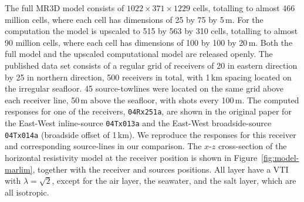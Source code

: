 \documentclass[
    paper,
  ]{geophysics}
\begin{document}
The full MR3D model consists of $1022 \times 371 \times 1229$ cells, totalling to almost 466 million cells, where each cell has dimensions of 25 by 75 by 5\,m. For the computation the model is upscaled to 515 by 563 by 310 cells, totalling to almost 90 million cells, where each cell has dimensions of 100 by 100 by 20\,m. Both the full model and the upscaled computational model are released openly. The published data set consists of a regular grid of receivers of 20 in eastern direction by 25 in northern direction, 500 receivers in total, with 1\,km spacing located on the irregular seafloor. 45 source-towlines were located on the same grid above each receiver line, 50\,m above the seafloor, with shots every 100\,m. The computed responses for one of the receivers, \texttt{04Rx251a}, are shown in the original paper for the East-West inline-source \texttt{04Tx013a} and the East-West broadside-source \texttt{04Tx014a} (broadside offset of 1\,km). We reproduce the responses for this receiver and corresponding source-lines in our comparison. The $x$-$z$ cross-section of the horizontal resistivity model at the receiver position is shown in Figure~\ref{fig:model-marlim}, together with the receiver and sources positions. All layer have a VTI with $\lambda=\sqrt{2}$, except for the air layer, the seawater, and the salt layer, which are all isotropic.

%
%
\end{document}
